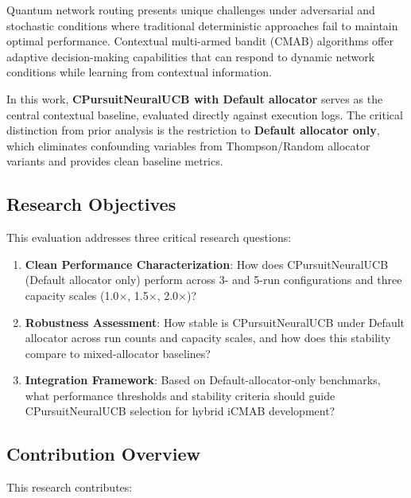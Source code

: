 \documentclass[12pt,a4paper]{article}
\newcommand{\primarytext}[1]{\textcolor{primaryblue}{\textbf{#1}}}
\begin{document}
Quantum network routing presents unique challenges under adversarial and stochastic conditions where traditional deterministic approaches fail to maintain optimal performance. Contextual multi-armed bandit (CMAB) algorithms offer adaptive decision-making capabilities that can respond to dynamic network conditions while learning from contextual information.

In this work, \primarytext{CPursuitNeuralUCB with Default allocator} serves as the central contextual baseline, evaluated directly against execution logs. The critical distinction from prior analysis is the restriction to \textbf{Default allocator only}, which eliminates confounding variables from Thompson/Random allocator variants and provides clean baseline metrics.

\subsection{Research Objectives}

This evaluation addresses three critical research questions:

\begin{enumerate}
    \item \textbf{Clean Performance Characterization}: How does CPursuitNeuralUCB (Default allocator only) perform across 3- and 5-run configurations and three capacity scales (1.0$\times$, 1.5$\times$, 2.0$\times$)?
    
    \item \textbf{Robustness Assessment}: How stable is CPursuitNeuralUCB under Default allocator across run counts and capacity scales, and how does this stability compare to mixed-allocator baselines?
    
    \item \textbf{Integration Framework}: Based on Default-allocator-only benchmarks, what performance thresholds and stability criteria should guide CPursuitNeuralUCB selection for hybrid iCMAB development?
\end{enumerate}

\subsection{Contribution Overview}

This research contributes:
\end{document}
